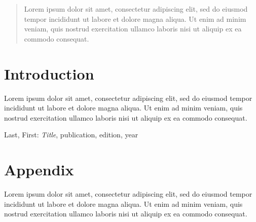 \documentclass[a4, english, twoside]{article}
\begin{document}
\maketitle

\begin{abstract}
\noindent
Lorem ipsum dolor sit amet, consectetur adipiscing elit, sed do eiusmod tempor incididunt ut labore et dolore magna aliqua. Ut enim ad minim veniam, quis nostrud exercitation ullamco laboris nisi ut aliquip ex ea commodo consequat.
\end{abstract}

\tableofcontents

\newpage
\section{Introduction} \label{sec:intro}
Lorem ipsum dolor sit amet, consectetur adipiscing elit, sed do eiusmod tempor incididunt ut labore et dolore magna aliqua. Ut enim ad minim veniam, quis nostrud exercitation ullamco laboris nisi ut aliquip ex ea commodo consequat.



\begin{thebibliography}{9}
	Last, First: \emph{Title}, publication, edition, year
\end{thebibliography}



\newpage
\appendix
\section{Appendix}
Lorem ipsum dolor sit amet, consectetur adipiscing elit, sed do eiusmod tempor incididunt ut labore et dolore magna aliqua. Ut enim ad minim veniam, quis nostrud exercitation ullamco laboris nisi ut aliquip ex ea commodo consequat.
\end{document}
